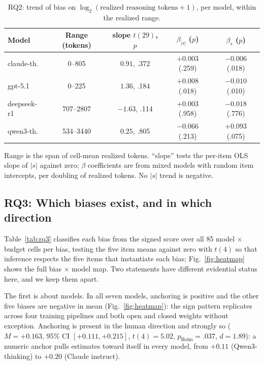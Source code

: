 \documentclass[conference]{IEEEtran}
\begin{document}
\begin{table}[!t]
\centering
\caption{RQ2: trend of bias on $\log_2(\text{realized reasoning tokens}+1)$, per model, within the realized range.}
\label{tab:rq2}
\footnotesize
\setlength{\tabcolsep}{3pt}
\begin{tabular}{lcccc}
\hline
Model & Range (tokens) & slope $t(29)$, $p$ & $\beta_{|s|}$ ($p$) & $\beta_{s}$ ($p$) \\
\hline
claude-th.  & 0--805    & $0.91$, .372  & $+0.003$ (.259) & $-0.006$ (.018) \\
gpt-5.1     & 0--225    & $1.36$, .184  & $+0.008$ (.018) & $-0.010$ (.010) \\
deepseek-r1 & 707--2807 & $-1.63$, .114 & $+0.003$ (.958) & $-0.018$ (.776) \\
qwen3-th.   & 534--3440 & $0.25$, .805  & $-0.066$ (.213) & $+0.093$ (.075) \\
\hline
\end{tabular}
\par\smallskip\footnotesize Range is the span of cell-mean realized tokens. ``slope'' tests the per-item OLS slope of $|s|$ against zero; $\beta$ coefficients are from mixed models with random item intercepts, per doubling of realized tokens. No $|s|$ trend is negative.
\end{table}

\subsection{RQ3: Which biases exist, and in which direction}
\label{sec:rq3}
Table~\ref{tab:rq3} classifies each bias from the signed score over all 85 model $\times$ budget cells per bias, testing the five item means against zero with $t(4)$ so that inference respects the five items that instantiate each bias; Fig.~\ref{fig:heatmap} shows the full bias $\times$ model map. Two statements have different evidential status here, and we keep them apart.

The first is about models. In all seven models, anchoring is positive and the other five biases are negative in mean (Fig.~\ref{fig:heatmap}): the sign pattern replicates across four training pipelines and both open and closed weights without exception. Anchoring is present in the human direction and strongly so ($M = +0.163$, 95\% CI $[+0.111, +0.215]$, $t(4) = 5.02$, $p_{\text{Holm}} = .037$, $d = 1.89$): a numeric anchor pulls estimates toward itself in every model, from $+0.11$ (Qwen3-thinking) to $+0.20$ (Claude instruct).
\end{document}
